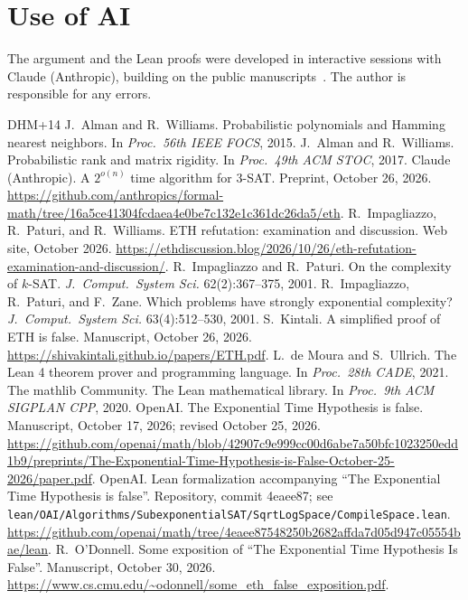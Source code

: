 \documentclass[11pt]{article}
\numberwithin{equation}{section}
\theoremstyle{remark}
\begin{document}
\section*{Use of AI}
The argument and the Lean proofs were developed in interactive sessions with Claude (Anthropic), building on the public manuscripts~\cite{OAI26,OD26,Cla26,Kin26}. The author is responsible for any errors.

\begin{thebibliography}{DHM+14}
 J.~Alman and R.~Williams. Probabilistic polynomials and Hamming nearest neighbors. In \emph{Proc.\ 56th IEEE FOCS}, 2015.
 J.~Alman and R.~Williams. Probabilistic rank and matrix rigidity. In \emph{Proc.\ 49th ACM STOC}, 2017.
 Claude (Anthropic). A $2^{o(n)}$ time algorithm for 3-SAT. Preprint, October 26, 2026. \url{https://github.com/anthropics/formal-math/tree/16a5ce41304fcdaea4e0be7c132e1c361dc26da5/eth}.
 R.~Impagliazzo, R.~Paturi, and R.~Williams. ETH refutation: examination and discussion. Web site, October 2026. \url{https://ethdiscussion.blog/2026/10/26/eth-refutation-examination-and-discussion/}.
 R.~Impagliazzo and R.~Paturi. On the complexity of $k$-SAT. \emph{J.\ Comput.\ System Sci.} 62(2):367--375, 2001.
 R.~Impagliazzo, R.~Paturi, and F.~Zane. Which problems have strongly exponential complexity? \emph{J.\ Comput.\ System Sci.} 63(4):512--530, 2001.
 S.~Kintali. A simplified proof of ETH is false. Manuscript, October 26, 2026. \url{https://shivakintali.github.io/papers/ETH.pdf}.
 L.~de Moura and S.~Ullrich. The Lean 4 theorem prover and programming language. In \emph{Proc.\ 28th CADE}, 2021.
 The mathlib Community. The Lean mathematical library. In \emph{Proc.\ 9th ACM SIGPLAN CPP}, 2020.
 OpenAI. The Exponential Time Hypothesis is false. Manuscript, October 17, 2026; revised October 25, 2026. \url{https://github.com/openai/math/blob/42907c9e999cc00d6abe7a50bfc1023250edd1b9/preprints/The-Exponential-Time-Hypothesis-is-False-October-25-2026/paper.pdf}.
 OpenAI. Lean formalization accompanying ``The Exponential Time Hypothesis is false''. Repository, commit 4eaee87; see \texttt{lean/OAI/Algorithms/SubexponentialSAT/SqrtLogSpace/CompileSpace.lean}. \url{https://github.com/openai/math/tree/4eaee87548250b2682affda7d05d947c05554bae/lean}.
 R.~O'Donnell. Some exposition of ``The Exponential Time Hypothesis Is False''. Manuscript, October 30, 2026. \url{https://www.cs.cmu.edu/~odonnell/some_eth_false_exposition.pdf}.
\end{thebibliography}
\end{document}
